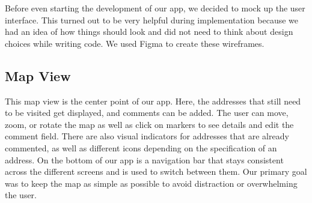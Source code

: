 \Author{\daAuthorTwo}

Before even starting the development of our app, we decided to mock up the user interface. This turned out to be very helpful during implementation because we had an idea of how things should look and did not need to think about design choices while writing code. We used Figma to create these wireframes.

\subsection{Map View}

This map view is the center point of our app. Here, the addresses that still need to be visited get displayed, and comments can be added. The user can move, zoom, or rotate the map as well as click on markers to see details and edit the comment field. There are also visual indicators for addresses that are already commented, as well as different icons depending on the specification of an address. On the bottom of our app is a navigation bar that stays consistent across the different screens and is used to switch between them. Our primary goal was to keep the map as simple as possible to avoid distraction or overwhelming the user.

